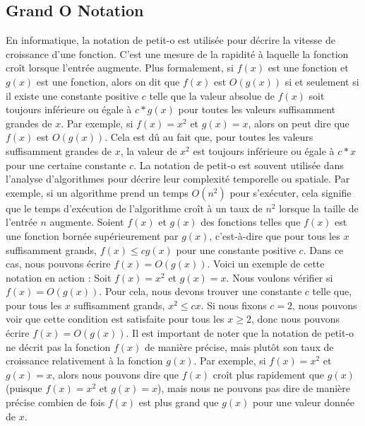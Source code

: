 \documentclass{article}
\begin{document}
                \subsection*{Grand O Notation}
    En informatique, la notation de petit-o est utilisée pour décrire la vitesse de croissance d'une fonction. C'est une mesure de la rapidité à laquelle la fonction croît lorsque l'entrée augmente.
    Plus formalement, si $f(x)$ est une fonction et $g(x)$ est une fonction, alors on dit que $f(x)$ est $O(g(x))$ si et seulement si il existe une constante positive $c$ telle que la valeur absolue de $f(x)$ soit toujours inférieure ou égale à $c * g(x)$ pour toutes les valeurs suffisamment grandes de $x$.
    Par exemple, si $f(x) = x^2$ et $g(x) = x$, alors on peut dire que $f(x)$ est $O(g(x))$. Cela est dû au fait que, pour toutes les valeurs suffisamment grandes de $x$, la valeur de $x^2$ est toujours inférieure ou égale à $c * x$ pour une certaine constante $c$.
    La notation de petit-o est souvent utilisée dans l'analyse d'algorithmes pour décrire leur complexité temporelle ou spatiale. Par exemple, si un algorithme prend un temps $O(n^2)$ pour s'exécuter, cela signifie que le temps d'exécution de l'algorithme croît à un taux de $n^2$ lorsque la taille de l'entrée $n$ augmente.
    Soient $f(x)$ et $g(x)$ des fonctions telles que $f(x)$ est une fonction bornée supérieurement par $g(x)$, c'est-à-dire que pour tous les $x$ suffisamment grands, $f(x) \le cg(x)$ pour une constante positive $c$. Dans ce cas, nous pouvons écrire $f(x) = O(g(x))$.
    Voici un exemple de cette notation en action :
    Soit $f(x) = x^2$ et $g(x) = x$. Nous voulons vérifier si $f(x) = O(g(x))$. Pour cela, nous devons trouver une constante $c$ telle que, pour tous les $x$ suffisamment grands, $x^2 \le cx$. Si nous fixons $c = 2$, nous pouvons voir que cette condition est satisfaite pour tous les $x \ge 2$, donc nous pouvons écrire $f(x) = O(g(x))$.
    Il est important de noter que la notation de petit-o ne décrit pas la fonction $f(x)$ de manière précise, mais plutôt son taux de croissance relativement à la fonction $g(x)$. Par exemple, si $f(x) = x^2$ et $g(x) = x$, alors nous pouvons dire que $f(x)$ croît plus rapidement que $g(x)$ (puisque $f(x) = x^2$ et $g(x) = x$), mais nous ne pouvons pas dire de manière précise combien de fois $f(x)$ est plus grand que $g(x)$ pour une valeur donnée de $x$.
\end{document}
